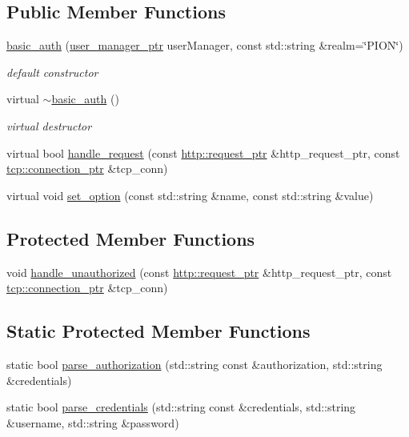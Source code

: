 \subsection*{Public Member Functions}
\begin{DoxyCompactItemize}
\item 
\hyperlink{classpion_1_1http_1_1basic__auth_a81644f280b0c499a06e0d44bccc83773}{basic\-\_\-auth} (\hyperlink{namespacepion_a20602680730b88b8efd08b3730d601af}{user\-\_\-manager\-\_\-ptr} user\-Manager, const std\-::string \&realm=\char`\"{}P\-I\-O\-N\char`\"{})
\begin{DoxyCompactList}\small\item\em default constructor \end{DoxyCompactList}\item 
virtual \hyperlink{classpion_1_1http_1_1basic__auth_a27a464fec905b9f071d1ecb3c026709b}{$\sim$basic\-\_\-auth} ()
\begin{DoxyCompactList}\small\item\em virtual destructor \end{DoxyCompactList}\item 
virtual bool \hyperlink{classpion_1_1http_1_1basic__auth_a032fb3d76e1e4f4e484a97bae7f5b367}{handle\-\_\-request} (const \hyperlink{namespacepion_1_1http_ace432b70a9459d50ff4969a7a47f0ccb}{http\-::request\-\_\-ptr} \&http\-\_\-request\-\_\-ptr, const \hyperlink{namespacepion_1_1tcp_a6c9b7497068009f6d81d95ec0b0627d6}{tcp\-::connection\-\_\-ptr} \&tcp\-\_\-conn)
\item 
virtual void \hyperlink{classpion_1_1http_1_1basic__auth_a9da335bd02b00b82cff40cb333fe7ee7}{set\-\_\-option} (const std\-::string \&name, const std\-::string \&value)
\end{DoxyCompactItemize}
\subsection*{Protected Member Functions}
\begin{DoxyCompactItemize}
\item 
void \hyperlink{classpion_1_1http_1_1basic__auth_ac8e9633bc2e16b21a564845ede483027}{handle\-\_\-unauthorized} (const \hyperlink{namespacepion_1_1http_ace432b70a9459d50ff4969a7a47f0ccb}{http\-::request\-\_\-ptr} \&http\-\_\-request\-\_\-ptr, const \hyperlink{namespacepion_1_1tcp_a6c9b7497068009f6d81d95ec0b0627d6}{tcp\-::connection\-\_\-ptr} \&tcp\-\_\-conn)
\end{DoxyCompactItemize}
\subsection*{Static Protected Member Functions}
\begin{DoxyCompactItemize}
\item 
static bool \hyperlink{classpion_1_1http_1_1basic__auth_ae93865f8cdee463b021a8746aa802026}{parse\-\_\-authorization} (std\-::string const \&authorization, std\-::string \&credentials)
\item 
static bool \hyperlink{classpion_1_1http_1_1basic__auth_a54f121e4a3385e44d9503bc3cb9f3385}{parse\-\_\-credentials} (std\-::string const \&credentials, std\-::string \&username, std\-::string \&password)
\end{DoxyCompactItemize}
